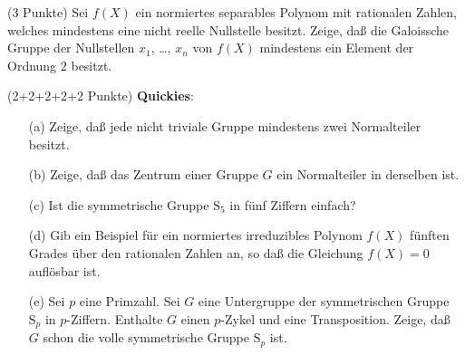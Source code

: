 \documentclass{algsheet}
\begin{document}
\begin{exercise}(3 Punkte)\newline
    Sei \(f(X)\) ein normiertes separables Polynom mit rationalen Zahlen, welches mindestens
    eine nicht reelle Nullstelle besitzt. Zeige, daß die Galoissche Gruppe 
    der Nullstellen \(x_1\), \dots, \(x_n\) von \(f(X)\) mindestens ein
    Element der Ordnung \(2\) besitzt.
\end{exercise}



\begin{exercise}(2+2+2+2+2 Punkte) \textbf{Quickies}:
   \begin{itemize}
    \item[(a)]     Zeige, daß jede nicht triviale Gruppe mindestens zwei Normalteiler besitzt.
     \item[(b)]     Zeige, daß das Zentrum einer Gruppe \(G\) ein Normalteiler in derselben ist.    
     \item[(c)]  Ist die symmetrische Gruppe \(\mathrm S_5\) in fünf Ziffern einfach?    
     \item[(d)]     Gib ein Beispiel für ein normiertes irreduzibles Polynom \(f(X)\) fünften Grades
        über den rationalen Zahlen an, so daß die Gleichung \(f(X) = 0\)
        auflösbar ist.
      \item[(e)]      Sei \(p\) eine Primzahl. Sei \(G\) eine Untergruppe der symmetrischen Gruppe
      \(\mathrm S_p\) in \(p\)-Ziffern. Enthalte \(G\) einen \(p\)-Zykel und eine Transposition.
      Zeige, daß \(G\) schon die volle symmetrische Gruppe \(\mathrm S_p\) ist.
    \end{itemize}
\end{exercise}
\end{document}
